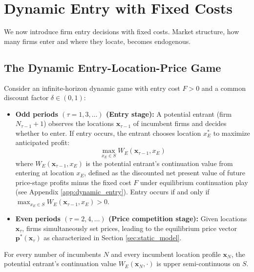 \documentclass{article}
\begin{document}
\section{Dynamic Entry with Fixed Costs}
\label{sec:dynamic}

We now introduce firm entry decisions with fixed costs. Market structure, how many firms enter and where they locate, becomes endogenous.

\subsection*{The Dynamic Entry-Location-Price Game}

Consider an infinite-horizon dynamic game with entry cost $F > 0$ and a common discount factor $\delta \in (0,1)$:

\begin{itemize}
  \item \textbf{Odd periods $(\tau=1,3,\ldots)$ (Entry stage):}
    A potential entrant (firm $N_{\tau-1}+1$) observes the locations $\mathbf{x}_{\tau-1}$ of incumbent firms and decides whether to enter. If entry occurs, the entrant chooses location $x_E^*$ to maximize anticipated profit:
    \begin{equation}
      \max_{x_E \in S} W_E(\mathbf{x}_{\tau-1}, x_E)
    \end{equation}
    where $W_E(\mathbf{x}_{\tau-1},x_E)$ is the potential entrant's continuation value from entering at location $x_E$, defined as the discounted net present value of future price-stage profits minus the fixed cost $F$ under equilibrium continuation play (see Appendix \ref{app:dynamic_entry}).
    Entry occurs if and only if \newline
    $\max_{x_E\in S} W_E(\mathbf{x}_{\tau-1},x_E) > 0$.

  \item \textbf{Even periods $(\tau=2,4,\ldots)$ (Price competition stage):}
    Given locations $\mathbf{x}_\tau$, firms simultaneously set prices, leading to the equilibrium price vector $\mathbf{p}^*(\mathbf{x}_\tau)$ as characterized in Section \ref{sec:static_model}.
\end{itemize}

\begin{assumption}\label{ass:entry_values}
  For every number of incumbents $N$ and every incumbent location profile $\mathbf{x}_N$, the potential entrant's continuation value
  $W_E(\mathbf{x}_N,\cdot)$ is upper semi-continuous on $S$.
\end{assumption}
\end{document}
